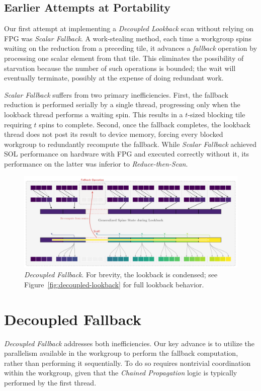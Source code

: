\documentclass[sigconf,screen]{acmart}
\begin{document}
\subsection{Earlier Attempts at Portability}
Our first attempt at implementing a \emph{Decoupled Lookback} scan without relying on FPG was \emph{Scalar Fallback}. A work-stealing method, each time a workgroup spins waiting on the reduction from a preceding tile, it advances a \emph{fallback} operation by processing one scalar element from that tile. This eliminates the possibility of starvation because the number of such operations is bounded; the wait will eventually terminate, possibly at the expense of doing redundant work.

\emph{Scalar Fallback} suffers from two primary inefficiencies. First, the fallback reduction is performed serially by a single thread, progressing only when the lookback thread performs a waiting spin. This results in a $t$-sized blocking tile requiring $t$ spins to complete. Second, once the fallback completes, the lookback thread does not post its result to device memory, forcing every blocked workgroup to redundantly recompute the fallback. While \emph{Scalar Fallback} achieved SOL performance on hardware with FPG and executed correctly without it, its performance on the latter was inferior to \emph{Reduce-then-Scan}.

\begin{figure}
  \centering
  \includegraphics[width=.95\textwidth]{graphics/DecoupledFallback.pdf}
  \caption{\emph{Decoupled Fallback}. For brevity, the lookback is condensed; see Figure~\ref{fig:decoupled-lookback} for full lookback behavior.}
  \label{fig:decoupled-fallback}
\end{figure}
\section{Decoupled Fallback}
\emph{Decoupled Fallback} addresses both inefficiencies. Our key advance is to utilize the parallelism available in the workgroup to perform the fallback computation, rather than performing it sequentially. To do so requires nontrivial coordination within the workgroup, given that the \emph{Chained Propagation} logic is typically performed by the first thread.
\end{document}
